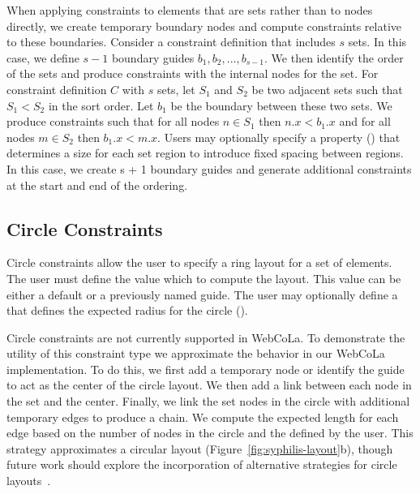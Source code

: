 When applying constraints to elements that are sets rather than to nodes
directly, we create temporary boundary nodes and compute constraints relative to
these boundaries. Consider a constraint definition that includes $s$ sets. 
In this case, we define $s-1$ boundary guides $b_1, b_2, ..., b_{s-1}$. We then
identify the order of the sets and produce constraints with the internal
nodes for the set. For constraint definition $C$ with $s$ sets, let $S_1$ and
$S_2$ be two adjacent sets such that $S_1 < S_2$ in the sort order. Let $b_1$ be
the boundary between these two sets. We produce constraints such that for all
nodes $n \in S_1$ then $n.x < b_1.x$ and for all nodes $m \in S_2$ then $b_1.x < m.x$.
Users may optionally specify a  property ()
that determines a size for each set region to introduce fixed spacing between regions.
In this case, we create s + 1 boundary guides and generate additional 
constraints at the start and end of the ordering.

\subsection{Circle Constraints}
Circle constraints allow the user to specify a ring layout for a set of
elements. The user must define the value  which to compute 
the layout. This value can be either a default  or a previously 
named guide. The user may optionally define a  that 
defines the expected radius for the circle ().

Circle constraints are not currently supported in WebCoLa. To
demonstrate the utility of this constraint type we approximate the behavior
in our WebCoLa implementation. To do this, we first add a temporary node
or identify the guide to act as the center of the circle layout.  We
then add a link between each
node in the set and the center. Finally, we link the set nodes in the circle
with additional temporary edges to produce a chain. We compute the expected
length for each edge based on the number of nodes in the circle and the 
 defined by the user. This strategy approximates a circular
layout (Figure~\ref{fig:syphilis-layout}b), though future work should
explore the incorporation of alternative strategies for circle layouts~\cite{dwyer2009layout}.

